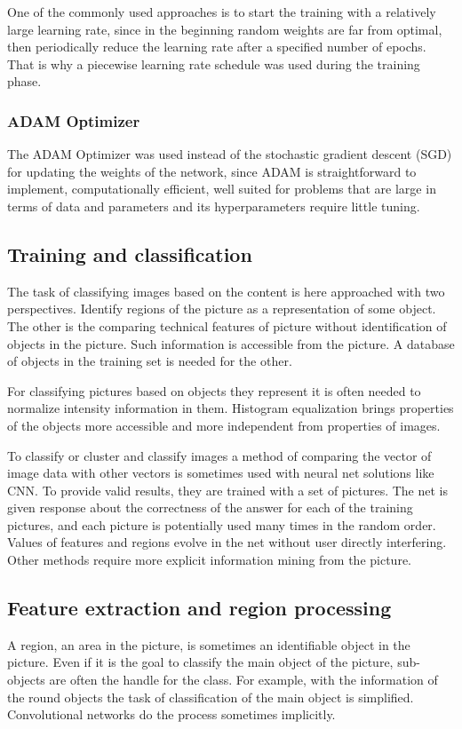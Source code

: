 \documentclass[doc/report.tex]{subfiles}
\begin{document}
One of the commonly used approaches is to start the training with a relatively large learning rate, since in the beginning random weights are far from optimal, then periodically reduce the learning rate after a specified number of epochs. That is why a piecewise learning rate schedule was used during the training phase.

\subsubsection{ADAM Optimizer}
The ADAM Optimizer was used instead of the stochastic gradient descent (SGD) for updating the weights of the network, since ADAM is straightforward to implement, computationally efficient, well suited for problems that are large in terms of data and parameters and its hyperparameters require little tuning.

\subsection{Training and classification}
The task of classifying images based on the content is here approached with two
perspectives. Identify regions of the picture as a representation of some
object. The other is the comparing technical features of picture without
identification of objects in the picture. Such information is accessible from
the picture. A database of objects in the training set is needed for the other.

For classifying pictures based on objects they represent it is often needed to
normalize intensity information in them. Histogram equalization brings
properties of the objects more accessible and more independent from properties
of images.

To classify or cluster and classify images a method of comparing the vector of
image data with other vectors is sometimes used with neural net solutions like
CNN. To provide valid results, they are trained with a set of pictures. The net
is given response about the correctness of the answer for each of the training
pictures, and each picture is potentially used many times in the random order.
Values of features and regions evolve in the net without user directly
interfering. Other methods require more explicit information mining from the
picture.

\subsection{Feature extraction and region processing}
A region, an area in the picture, is sometimes an identifiable object in the
picture. Even if it is the goal to classify the main object of the picture,
sub-objects are often the handle for the class. For example, with the
information of the round objects the task of classification of the main object
is simplified. Convolutional networks do the process sometimes implicitly.
\end{document}
